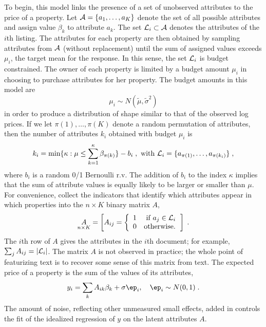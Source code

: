 \documentclass[12pt]{article}
\begin{document}
To begin, this model links the presence of a set of unobserved attributes to the price of a property.  Let ${\cal A} = \{a_1,\ldots, a_K\}$ denote the set of  all possible attributes and assign value $\beta_k$ to attribute $a_k$.  The set ${\cal L}_i \subset {\cal A}$ denotes the attributes of the $i$th listing.  The attributes for each property are then obtained by sampling attributes from $\cal A$ (without replacement) until the sum of assigned values exceeds $\mu_i$, the target mean for the response.  In this sense, the set ${\cal L}_i$ is budget constrained. The owner of each property is limited by a budget amount $\mu_i$ in choosing to purchase attributes for her property.  The budget amounts in this model are
\begin{equation}
  \mu_i  \sim N(\tilde\mu, \tilde\sigma^2)
\label{eq:mui}
\end{equation}
in order to produce a distribution of shape similar to that of the observed log prices. If we let $\pi(1), \ldots, \pi(K)$ denote a random permutation of attributes, then the number of attributes $k_i$ obtained with budget $\mu_i$ is 
\begin{equation}
	k_i = \min \{ \kappa:  \mu \le \sum_{k=1}^{\kappa} \beta_{\pi(k)} \} - b_i \;,
	\mbox{ with }
	{\cal L}_i = \{a_{\pi(1)}, \ldots, a_{\pi(k_i)} \} \;,
\label{eq:ki}
\end{equation}
where $b_i$ is a random 0/1 Bernoulli r.v.  The addition of $b_i$ to the index $\kappa$ implies that the sum of attribute values is equally likely to be larger or smaller than $\mu$.  For convenience,  collect the indicators that identify which attributes appear in which properties into the $n \times K$ binary matrix $A$,
\begin{equation}
  \underset{n \times K}{A} = \left[ A_{ij} =
              \left\{ \begin{array}{cc} 1 & \mbox{ if } a_j \in {\cal L}_i \cr 0 & \mbox{otherwise.} 
                       \end{array} \right. \right]  \;.
\end{equation}
The $i$th row of $A$ gives the attributes in the $i$th document; for example, $\sum_j A_{ij} = |{\cal L}_i|$. The matrix $A$ is not observed in practice; the whole point of featurizing text is to recover some sense of this matrix from text. The expected price of a property is the sum of the values of its attributes,
\begin{equation}
	y_i = \sum_k A_{ik} \beta_k + \sigma \ep_i, \quad \ep_i \sim N(0,1) \;.
\label{eq:yi}
\end{equation}
The amount of noise, reflecting other unmeasured small effects, added  in  controls the fit of the idealized regression of $y$ on the latent attributes $A$.  
\end{document}
